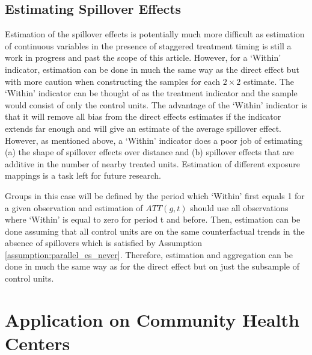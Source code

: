 \documentclass[11pt]{article}
\begin{document}
\subsection{Estimating Spillover Effects}

Estimation of the spillover effects is potentially much more difficult as estimation of continuous variables in the presence of staggered treatment timing is still a work in progress and past the scope of this article. However, for a `Within' indicator, estimation can be done in much the same way as the direct effect but with more caution when constructing the samples for each $2 \times 2$ estimate. The `Within' indicator can be thought of as the treatment indicator and the sample would consist of only the control units. The advantage of the `Within' indicator is that it will remove all bias from the direct effects estimates if the indicator extends far enough and will give an estimate of the average spillover effect. However, as mentioned above, a `Within' indicator does a poor job of estimating (a) the shape of spillover effects over distance and (b) spillover effects that are additive in the number of nearby treated units. Estimation of different exposure mappings is a task left for future research. 

Groups in this case will be defined by the period which `Within' first equals 1 for a given observation and estimation of $ATT(g,t)$ should use all observations where `Within' is equal to zero for period t and before. Then, estimation can be done assuming that all control units are on the same counterfactual trends in the absence of spillovers which is satisfied by Assumption \ref{assumption:parallel_es_never}. Therefore, estimation and aggregation can be done in much the same way as for the direct effect but on just the subsample of control units.


\section{Application on Community Health Centers}\label{sec:chc}
\end{document}
